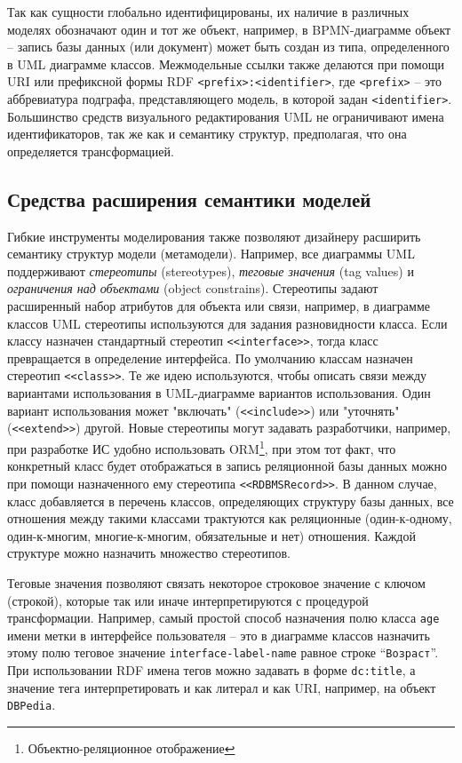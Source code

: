 \documentclass[conference]{IEEEtran} \IEEEoverridecommandlockouts
\begin{document}
Так как сущности глобально идентифицированы, их наличие в различных моделях обозначают один и тот же объект, например, в BPMN-диаграмме объект -- запись базы данных (или документ) может быть создан из типа, определенного в UML диаграмме классов. Межмодельные ссылки также делаются при помощи URI или префиксной формы RDF \texttt{<prefix>:<identifier>}, где \texttt{<prefix>} -- это аббревиатура подграфа, представляющего модель, в которой задан \texttt{<identifier>}. Большинство средств визуального редактирования UML не ограничивают имена идентификаторов, так же как и семантику структур, предполагая, что она определяется трансформацией. 

\subsection{Средства расширения семантики моделей} \label{sec:mod-ext} 

Гибкие инструменты моделирования также позволяют дизайнеру расширить семантику структур модели (метамодели). Например, все диаграммы UML поддерживают \emph{стереотипы} (stereotypes), \emph{теговые значения} (tag values) и \emph{ограничения над объектами} (object constrains). Стереотипы задают расширенный набор атрибутов для объекта или связи, например, в диаграмме классов UML стереотипы используются для задания разновидности класса. Если классу назначен стандартный стереотип \texttt{<<interface>>}, тогда класс превращается в определение интерфейса. По умолчанию классам назначен стереотип \texttt{<<class>>}. Те же идею используются, чтобы описать связи между вариантами использования в UML-диаграмме вариантов использования. Один вариант использования может "включать" (\texttt{<<include>>}) или "уточнять" (\texttt{<<extend>>}) другой. Новые стереотипы могут задавать разработчики, например, при разработке ИС удобно использовать ORM\footnote{Объектно-реляционное отображение}, при этом тот факт, что конкретный класс будет отображаться в запись реляционной базы данных можно при помощи назначенного ему стереотипа \texttt{<<RDBMSRecord>>}. В данном случае, класс добавляется в перечень классов, определяющих структуру базы данных, все отношения между такими классами трактуются как реляционные (один-к-одному, один-к-многим, многие-к-многим, обязательные и нет) отношения. Каждой структуре можно назначить множество стереотипов. 

Теговые значения позволяют связать некоторое строковое значение с ключом (строкой), которые так или иначе интерпретируются с процедурой трансформации. Например, самый простой способ назначения полю класса \texttt{age} имени метки в интерфейсе пользователя -- это в диаграмме классов назначить этому полю теговое значение \texttt{interface-label-name} равное строке ``\texttt{Возраст}''. При использовании RDF имена тегов можно задавать в форме \texttt{dc:title}, а значение тега интерпретировать и как литерал и как URI, например, на объект \texttt{DBPedia}. 
\end{document}
